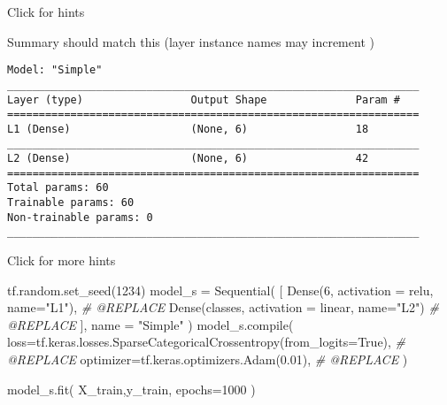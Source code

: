 \documentclass[11pt]{article}
\newenvironment{Shaded}{}{}
\newcommand{\DecValTok}[1]{\textcolor[rgb]{0.25,0.63,0.44}{{#1}}}
\newcommand{\FloatTok}[1]{\textcolor[rgb]{0.25,0.63,0.44}{{#1}}}
\newcommand{\StringTok}[1]{\textcolor[rgb]{0.25,0.44,0.63}{{#1}}}
\newcommand{\CommentTok}[1]{\textcolor[rgb]{0.38,0.63,0.69}{\textit{{#1}}}}
\newcommand{\NormalTok}[1]{{#1}}
\newcommand{\VariableTok}[1]{\textcolor[rgb]{0.10,0.09,0.49}{{#1}}}
\newcommand{\OperatorTok}[1]{\textcolor[rgb]{0.40,0.40,0.40}{{#1}}}
\newcommand{\BuiltInTok}[1]{{#1}}
\begin{document}
    Click for hints

Summary should match this (layer instance names may increment )

\begin{verbatim}
Model: "Simple"
_________________________________________________________________
Layer (type)                 Output Shape              Param #   
=================================================================
L1 (Dense)                   (None, 6)                 18        
_________________________________________________________________
L2 (Dense)                   (None, 6)                 42        
=================================================================
Total params: 60
Trainable params: 60
Non-trainable params: 0
_________________________________________________________________
\end{verbatim}

Click for more hints

\begin{Shaded}
\begin{Highlighting}[]
\NormalTok{tf.random.set\_seed(}\DecValTok{1234}\NormalTok{)}
\NormalTok{model\_s }\OperatorTok{=}\NormalTok{ Sequential(}
\NormalTok{    [}
\NormalTok{        Dense(}\DecValTok{6}\NormalTok{, activation }\OperatorTok{=} \StringTok{\textquotesingle{}relu\textquotesingle{}}\NormalTok{, name}\OperatorTok{=}\StringTok{"L1"}\NormalTok{),            }\CommentTok{\# @REPLACE}
\NormalTok{        Dense(classes, activation }\OperatorTok{=} \StringTok{\textquotesingle{}linear\textquotesingle{}}\NormalTok{, name}\OperatorTok{=}\StringTok{"L2"}\NormalTok{)     }\CommentTok{\# @REPLACE}
\NormalTok{    ], name }\OperatorTok{=} \StringTok{"Simple"}
\NormalTok{)}
\NormalTok{model\_s.}\BuiltInTok{compile}\NormalTok{(}
\NormalTok{    loss}\OperatorTok{=}\NormalTok{tf.keras.losses.SparseCategoricalCrossentropy(from\_logits}\OperatorTok{=}\VariableTok{True}\NormalTok{),     }\CommentTok{\# @REPLACE}
\NormalTok{    optimizer}\OperatorTok{=}\NormalTok{tf.keras.optimizers.Adam(}\FloatTok{0.01}\NormalTok{),     }\CommentTok{\# @REPLACE}
\NormalTok{)}

\NormalTok{model\_s.fit(}
\NormalTok{    X\_train,y\_train,}
\NormalTok{    epochs}\OperatorTok{=}\DecValTok{1000}
\NormalTok{)                                   }
\end{Highlighting}
\end{Shaded}
\end{document}

